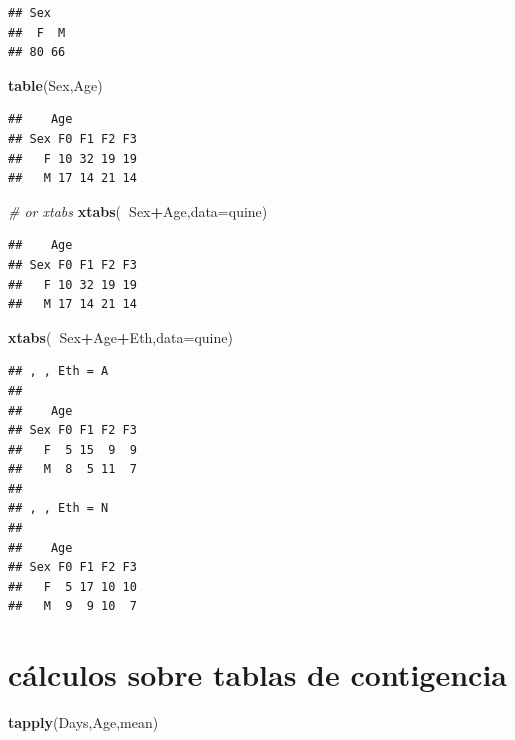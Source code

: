 \documentclass[]{book}
\newenvironment{Shaded}{\begin{snugshade}}{\end{snugshade}}
\newcommand{\KeywordTok}[1]{\textcolor[rgb]{0.13,0.29,0.53}{\textbf{#1}}}
\newcommand{\DataTypeTok}[1]{\textcolor[rgb]{0.13,0.29,0.53}{#1}}
\newcommand{\CommentTok}[1]{\textcolor[rgb]{0.56,0.35,0.01}{\textit{#1}}}
\newcommand{\OperatorTok}[1]{\textcolor[rgb]{0.81,0.36,0.00}{\textbf{#1}}}
\newcommand{\NormalTok}[1]{#1}
\begin{document}
\begin{verbatim}
## Sex
##  F  M 
## 80 66
\end{verbatim}

\begin{Shaded}
\begin{Highlighting}[]
\KeywordTok{table}\NormalTok{(Sex,Age)}
\end{Highlighting}
\end{Shaded}

\begin{verbatim}
##    Age
## Sex F0 F1 F2 F3
##   F 10 32 19 19
##   M 17 14 21 14
\end{verbatim}

\begin{Shaded}
\begin{Highlighting}[]
\CommentTok{# or xtabs}
\KeywordTok{xtabs}\NormalTok{(}\OperatorTok{~}\NormalTok{Sex}\OperatorTok{+}\NormalTok{Age,}\DataTypeTok{data=}\NormalTok{quine)}
\end{Highlighting}
\end{Shaded}

\begin{verbatim}
##    Age
## Sex F0 F1 F2 F3
##   F 10 32 19 19
##   M 17 14 21 14
\end{verbatim}

\begin{Shaded}
\begin{Highlighting}[]
\KeywordTok{xtabs}\NormalTok{(}\OperatorTok{~}\NormalTok{Sex}\OperatorTok{+}\NormalTok{Age}\OperatorTok{+}\NormalTok{Eth,}\DataTypeTok{data=}\NormalTok{quine)}
\end{Highlighting}
\end{Shaded}

\begin{verbatim}
## , , Eth = A
## 
##    Age
## Sex F0 F1 F2 F3
##   F  5 15  9  9
##   M  8  5 11  7
## 
## , , Eth = N
## 
##    Age
## Sex F0 F1 F2 F3
##   F  5 17 10 10
##   M  9  9 10  7
\end{verbatim}

\section{cálculos sobre tablas de
contigencia}\label{calculos-sobre-tablas-de-contigencia}

\begin{Shaded}
\begin{Highlighting}[]
\KeywordTok{tapply}\NormalTok{(Days,Age,mean)}
\end{Highlighting}
\end{Shaded}
\end{document}
